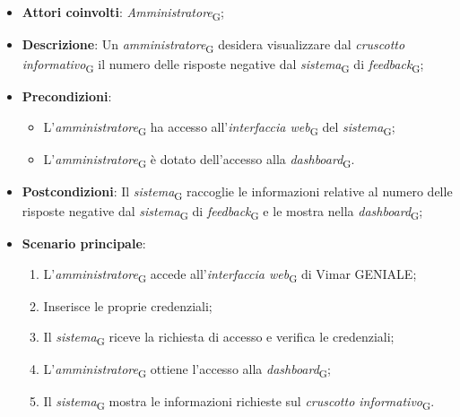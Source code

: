 \begin{itemize}
    \item \textbf{Attori coinvolti}: \textit{Amministratore}\textsubscript{G};
    \item \textbf{Descrizione}: Un \textit{amministratore}\textsubscript{G} desidera visualizzare dal \textit{cruscotto informativo}\textsubscript{G} il numero delle risposte negative dal \textit{sistema}\textsubscript{G} di \textit{feedback}\textsubscript{G};
    \item \textbf{Precondizioni}: 
    \begin{itemize}
        \item L’\textit{amministratore}\textsubscript{G} ha accesso all’\textit{interfaccia web}\textsubscript{G} del \textit{sistema}\textsubscript{G};
        \item L’\textit{amministratore}\textsubscript{G} è dotato dell’accesso alla \textit{dashboard}\textsubscript{G}.
    \end{itemize}
    \item \textbf{Postcondizioni}: Il \textit{sistema}\textsubscript{G} raccoglie le informazioni relative al numero delle risposte negative dal \textit{sistema}\textsubscript{G} di \textit{feedback}\textsubscript{G} e le mostra nella \textit{dashboard}\textsubscript{G};
    \item \textbf{Scenario principale}:
    \begin{enumerate}
        \item L’\textit{amministratore}\textsubscript{G} accede all’\textit{interfaccia web}\textsubscript{G} di Vimar GENIALE;
        \item Inserisce le proprie credenziali;
        \item Il \textit{sistema}\textsubscript{G} riceve la richiesta di accesso e verifica le credenziali;
        \item L’\textit{amministratore}\textsubscript{G} ottiene l’accesso alla \textit{dashboard}\textsubscript{G};
        \item Il \textit{sistema}\textsubscript{G} mostra le informazioni richieste sul \textit{cruscotto informativo}\textsubscript{G}.
    \end{enumerate}
\end{itemize}



